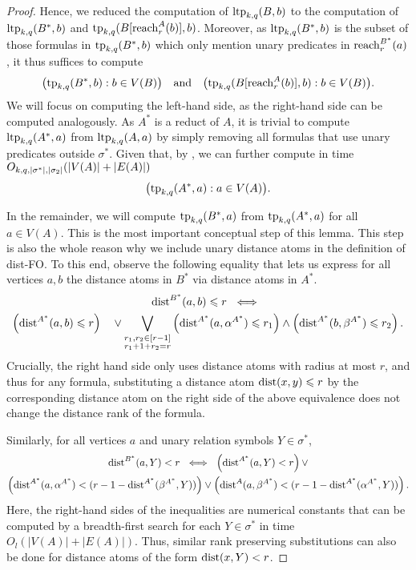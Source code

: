 \begin{proof}
  Hence, we reduced the computation of \(\textnormal{ltp}_{k,q}({{B}},b)\) 
  to the computation of \(\textnormal{ltp}_{k,q}({{B}}^*,b)\) and 
  \(\textnormal{tp}_{k,q}({{B}}[{\rm reach}_r^{{A}}(b)],b)\).
  Moreover, as $\textnormal{ltp}_{k,q}(B^*,b)$ is the subset of those formulas in  $\textnormal{tp}_{k,q}(B^*,b)$ 
  which only mention unary predicates in ${\rm reach}^{B^*}_r(a)$, it thus suffices to compute
  \[
      \bigl(\textnormal{tp}_{k,q}(B^*,b):b\in V({{B}})\bigr) \quad\text{and}\quad 
      \bigl(\textnormal{tp}_{k,q}(B[{\rm reach}_r^{{{A}} }(b)],b):b\in V({{B}})\bigr).
  \]
  We will focus on computing the left-hand side, as the right-hand side can be computed analogously.
  As \(A^*\) is a reduct of \(A\), it is trivial to compute \(\textnormal{ltp}_{k,q}(A^*, a)\) from \(\textnormal{ltp}_{k,q}(A,a)\) by simply removing all formulas that use unary predicates outside \(\sigma^*\).
  Given that, by , we can further compute in time
  $O_{k,q,|\sigma^*|,|\sigma_2|}(|V({{A}})|+|E(A)|)$ 
  $$\bigl(\textnormal{tp}_{k,q}(A^*,a):a\in V({{A}})\bigr).$$


  In the remainder, we will compute \(\textnormal{tp}_{k,q}({{B}}^*, a)\) from \(\textnormal{tp}_{k,q}(A^*, a)\) for all \(a \in V(A)\).
  This is the most important conceptual step of this lemma.
  This step is also the whole reason why we include unary distance atoms in the definition of dist-FO.
    To this end, observe the following equality that lets us express for all vertices \(a,b\) the distance atoms in \(B^*\) via distance atoms in \(A^*\).
    \begin{multline*}%
        \dist^{B^*}(a,b) \le r ~\iff~\\ \left(\dist^{A^*}(a,b) \le r\right) \quad \lor \bigvee_{\substack{r_1,r_2\in [r-1]\\r_1+1+r_2=r}} \left(\dist^{A^*}(a,\alpha^{\str A^*}) \le r_1\right) \land \left(\dist^{A^*}(b,\beta^{\str A^*}) \le r_2\right).
    \end{multline*}
    Crucially, the right hand side only uses distance atoms with radius at most \(r\), and thus
    for any formula, substituting a distance atom \(\mathrm{dist}(x,y) \leqslant r\) by the corresponding distance atom on the right side
    of the above equivalence
    does not change the distance rank of the formula.

    Similarly, for all vertices \(a\) and unary relation symbols \(Y\in \sigma^*\),
    \begin{multline*}%
      \dist^{B^*}(a,Y) < r ~\iff~\left(\dist^{A^*}(a,Y) < r\right)\lor\\ \left(\dist^{A^*}(a,\alpha^{A^*}) < (r - 1 - \dist^{A^*}(\beta^{A^*},Y)) \right)
                            \lor  \left(\dist^{A}(a,\beta^{A^*}) < (r - 1 - \dist^{A^*}(\alpha^{A^*},Y)) \right).
    \end{multline*}
    Here, the right-hand sides of the inequalities are numerical constants that can be computed by a breadth-first search for each \(Y\in \sigma^*\) in time \(O_{l}(|V(A)|+|E(A)|)\).
    Thus, similar rank preserving substitutions can also be done for distance atoms of the form \(\mathrm{dist}(x,Y) < r\).


\end{proof}
